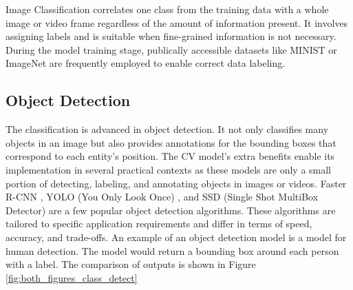 Image Classification correlates one class from the training data with a whole image or video frame regardless of the amount of information present. It involves assigning labels and is suitable when fine-grained information is not necessary. During the model training stage, publically accessible datasets like MINIST or ImageNet \cite{datasetssss} are frequently employed to enable correct data labeling.

\subsection{Object Detection}
The classification is advanced in object detection. It not only classifies many objects in an image but also provides annotations for the bounding boxes that correspond to each entity's position. The CV model's extra benefits enable its implementation in several practical contexts as these models are only a small portion of detecting, labeling, and annotating objects in images or videos. Faster R-CNN \cite{girshick2014rich}, YOLO (You Only Look Once) \cite{redmon2016you}, and SSD (Single Shot MultiBox Detector)\cite{liu2016ssd} are a few popular object detection algorithms. These algorithms are tailored to specific application requirements and differ in terms of speed, accuracy, and trade-offs.  An example of an object detection model is a model for human detection. The model would return a bounding box around each person with a label. The comparison of outputs is shown in Figure \ref{fig:both_figures_class_detect}

